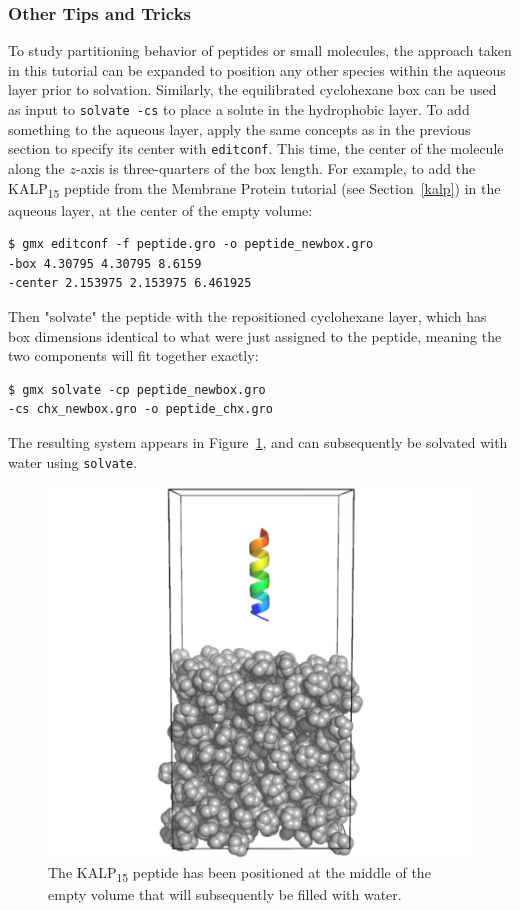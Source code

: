 \documentclass[9pt,tutorial]{livecoms}
\begin{document}
\subsubsection{Other Tips and Tricks} \label{biphasic_tips_tricks}

To study partitioning behavior of peptides or small molecules, the approach taken in this tutorial can be expanded to position any other species within the aqueous layer prior to solvation. Similarly, the equilibrated cyclohexane box can be used as input to \texttt{solvate -cs} to place a solute in the hydrophobic layer. To add something to the aqueous layer, apply the same concepts as in the previous section to specify its center with \texttt{editconf}. This time, the center of the molecule along the $z$-axis is three-quarters of the box length. For example, to add the KALP\textsubscript{15} peptide from the Membrane Protein tutorial (see Section~\ref{kalp}) in the aqueous layer, at the center of the empty volume:

\begin{verbatim}
$ gmx editconf -f peptide.gro -o peptide_newbox.gro
-box 4.30795 4.30795 8.6159
-center 2.153975 2.153975 6.461925
\end{verbatim}

Then "solvate" the peptide with the repositioned cyclohexane layer, which has box dimensions identical to what were just assigned to the peptide, meaning the two components will fit together exactly:

\begin{verbatim}
$ gmx solvate -cp peptide_newbox.gro
-cs chx_newbox.gro -o peptide_chx.gro
\end{verbatim}

The resulting system appears in Figure~\ref{peptide_chx_fig}, and can subsequently be solvated with water using \texttt{solvate}.

\begin{figure}[h!]
\centering
\includegraphics{peptide_chx}
\caption{The KALP\textsubscript{15} peptide has been positioned at the middle of the empty volume that will subsequently be filled with water.}
\label{peptide_chx_fig}
\end{figure}
\end{document}
